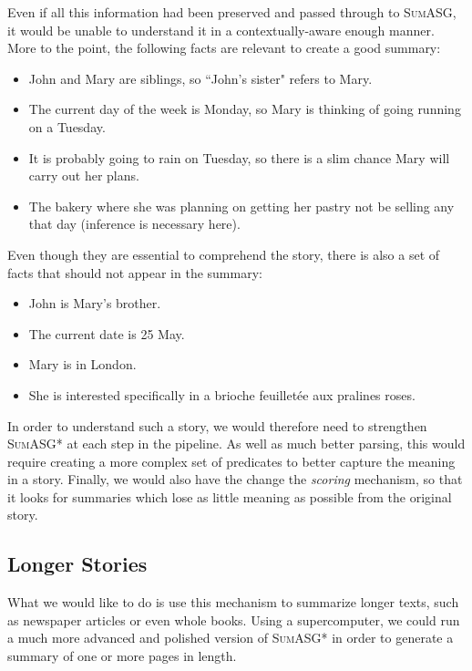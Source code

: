 Even if all this information had been preserved and passed through to \textsc{SumASG}, it would be unable to understand it in a contextually-aware enough manner. More to the point, the following facts are relevant to create a good summary:

\begin{itemize}
\item John and Mary are siblings, so ``John's sister" refers to Mary.
\item The current day of the week is Monday, so Mary is thinking of going running on a Tuesday.
\item It is probably going to rain on Tuesday, so there is a slim chance Mary will carry out her plans.
\item The bakery where she was planning on getting her pastry not be selling any that day (inference is necessary here).
\end{itemize}

Even though they are essential to comprehend the story, there is also a set of facts that should not appear in the summary:

\begin{itemize}
\item John is Mary's brother.
\item The current date is 25 May.
\item Mary is in London.
\item She is interested specifically in a brioche feuilletée aux pralines roses.
\end{itemize}

In order to understand such a story, we would therefore need to strengthen \textsc{SumASG*} at each step in the pipeline. As well as much better parsing, this would require creating a more complex set of predicates to better capture the meaning in a story. Finally, we would also have the change the \textit{scoring} mechanism, so that it looks for summaries which lose as little meaning as possible from the original story.

\subsection{Longer Stories}

What we would like to do is use this mechanism to summarize longer texts, such as newspaper articles or even whole books. Using a supercomputer, we could run a much more advanced and polished version of \textsc{SumASG*} in order to generate a summary of one or more pages in length.

